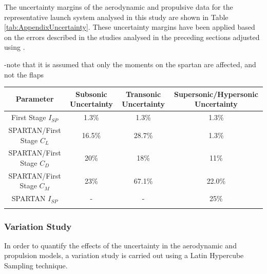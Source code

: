 The uncertainty margins of the aerodynamic and propulsive data for the representative launch system analysed in this study are shown in Table \ref{tab:AppendixUncertainty}. These uncertainty margins have been applied based on the errors described in the studies analysed in the preceding sections adjusted using . 

-note that it is assumed that only the moments on the spartan are affected, and not the flaps


\begin{tabular}{|c|c|c|c|}
	\hline  Parameter & Subsonic Uncertainty & Transonic Uncertainty  & Supersonic/Hypersonic Uncertainty \\ 
	\hline  First Stage $I_{SP}$ & 1.3\% & 1.3\% &  1.3\% \\ 
	\hline  SPARTAN/First Stage $C_L$ & 16.5\% & 28.7\% & 1.3\% \\  
	\hline  SPARTAN/First Stage $C_D$ & 20\% & 18\% & 11\% \\  
	\hline  SPARTAN/First Stage $C_M$  & 23\% & 67.1\% &  22.0\% \\ 
	\hline  SPARTAN $I_{SP}$ & - & - &  25\% \\ 
	\label{tab:AppendixUncertainty}
\end{tabular}

\subsubsection{Variation Study}
In order to quantify the effects of the uncertainty in the aerodynamic and propulsion models, a variation study is carried out using a Latin Hypercube Sampling technique. 

